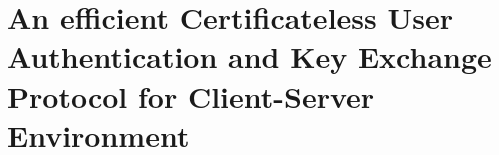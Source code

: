 \chapter {An efficient Certificateless User Authentication and Key Exchange Protocol for Client-Server Environment}
\label{Ch3}

